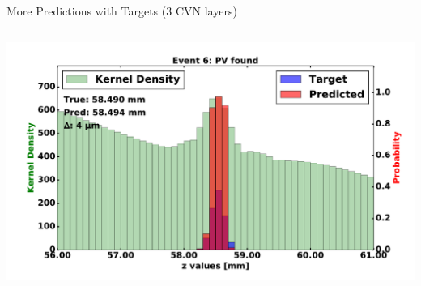 \begin{frame}{More Predictions with Targets (3 CVN layers)}
\begin{columns}[c]
\begin{center}
           \includegraphics[width=1\textwidth, height=0.45\textwidth, trim=18 0 18 0]{images/120000_3layer_39.pdf}
       \end{center}
  \end{columns}
\end{frame}

